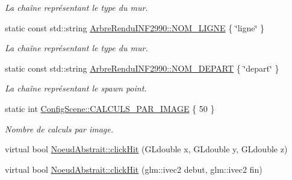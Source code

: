 \begin{DoxyCompactItemize}
\begin{DoxyCompactList}\small\item\em La chaîne représentant le type du mur. \end{DoxyCompactList}\item 
\hypertarget{group__inf2990_ga776d72e2b41b06f1992ba48b1ed3de0b}{}static const std\+::string \hyperlink{group__inf2990_ga776d72e2b41b06f1992ba48b1ed3de0b}{Arbre\+Rendu\+I\+N\+F2990\+::\+N\+O\+M\+\_\+\+L\+I\+G\+N\+E} \{ \char`\"{}ligne\char`\"{} \}\label{group__inf2990_ga776d72e2b41b06f1992ba48b1ed3de0b}

\begin{DoxyCompactList}\small\item\em La chaîne représentant le type du mur. \end{DoxyCompactList}\item 
\hypertarget{group__inf2990_ga7f23ccbd07f9afea9685f108c4053834}{}static const std\+::string \hyperlink{group__inf2990_ga7f23ccbd07f9afea9685f108c4053834}{Arbre\+Rendu\+I\+N\+F2990\+::\+N\+O\+M\+\_\+\+D\+E\+P\+A\+R\+T} \{ \char`\"{}depart\char`\"{} \}\label{group__inf2990_ga7f23ccbd07f9afea9685f108c4053834}

\begin{DoxyCompactList}\small\item\em La chaîne représentant le spawn point. \end{DoxyCompactList}\item 
\hypertarget{group__inf2990_gadb487b450a0314a5d1f75cf31ce502eb}{}static int \hyperlink{group__inf2990_gadb487b450a0314a5d1f75cf31ce502eb}{Config\+Scene\+::\+C\+A\+L\+C\+U\+L\+S\+\_\+\+P\+A\+R\+\_\+\+I\+M\+A\+G\+E} \{ 50 \}\label{group__inf2990_gadb487b450a0314a5d1f75cf31ce502eb}

\begin{DoxyCompactList}\small\item\em Nombre de calculs par image. \end{DoxyCompactList}\end{DoxyCompactItemize}
\begin{DoxyCompactItemize}
\item 
virtual bool \hyperlink{group__inf2990_ga2e40156a7ff6dd734c61de990db1bfe0}{Noeud\+Abstrait\+::click\+Hit} (G\+Ldouble x, G\+Ldouble y, G\+Ldouble z)
\item 
virtual bool \hyperlink{group__inf2990_gad1d1a9c6adcedfcd5eda6c6d4e67a50f}{Noeud\+Abstrait\+::click\+Hit} (glm\+::ivec2 debut, glm\+::ivec2 fin)
\end{DoxyCompactItemize}


